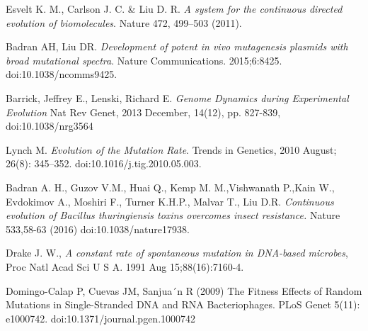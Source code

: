 \documentclass[10pt,letterpaper]{article}
\begin{document}
\nolinenumbers

\begin{thebibliography}{10}

Esvelt K. M., Carlson J. C. \& Liu D. R.
\newblock \textit{A system for the continuous directed evolution of biomolecules}.
\newblock Nature 472, 499–503 (2011).

Badran AH, Liu DR.
\newblock \textit{{D}evelopment of potent in vivo mutagenesis plasmids with broad mutational spectra}.
\newblock Nature Communications. 2015;6:8425. doi:10.1038/ncomms9425.

Barrick, Jeffrey E., Lenski, Richard E.
\newblock \textit{{G}enome Dynamics during Experimental Evolution}
\newblock  Nat Rev Genet, 2013 December, 14(12), pp. 827-839, doi:10.1038/nrg3564

Lynch M.
\newblock \textit{{E}volution of the Mutation Rate}.
\newblock Trends in Genetics, 2010 August; 26(8): 345–352. doi:10.1016/j.tig.2010.05.003.

  Badran A. H., Guzov V.M., Huai Q., Kemp M. M.,Vishwanath P.,Kain W., Evdokimov A., Moshiri F., Turner K.H.P., Malvar T., Liu D.R.
  \newblock \textit{{C}ontinuous evolution of Bacillus thuringiensis toxins overcomes insect resistance.}
  \newblock  Nature 533,58-63 (2016) doi:10.1038/nature17938.

  Drake J. W., 
  \newblock \textit{{A} constant rate of spontaneous mutation in DNA-based microbes}, 
  \newblock  Proc Natl Acad Sci U S A. 1991 Aug 15;88(16):7160-4.

  Domingo-Calap P, Cuevas JM, Sanjua´n R (2009)
\newblock The Fitness Effects of Random Mutations in Single-Stranded DNA and RNA Bacteriophages.
\newblock PLoS Genet 5(11): e1000742. doi:10.1371/journal.pgen.1000742

\end{thebibliography}

\end{document}
